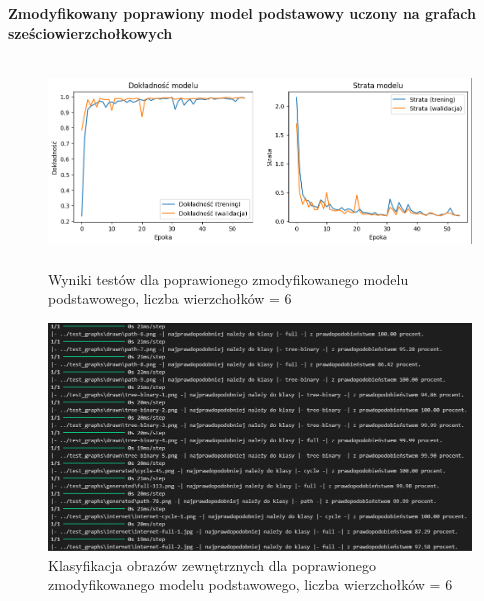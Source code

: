 
\textbf{Zmodyfikowany poprawiony model podstawowy uczony na grafach sześciowierzchołkowych}




\begin{figure}[ht]
	\centering
	\includegraphics[height=5.5cm]{resources/tests/images/v4/base6_1_1_img.png}
	\caption{Wyniki testów dla poprawionego zmodyfikowanego modelu podstawowego, liczba wierzchołków = 6}
	\label{Fig:tests-base-6a}
\end{figure}
\FloatBarrier


\begin{figure}[ht]
	\centering
	\includegraphics[width=14cm]{resources/tests/images/v4/base6_1_1_txt.png}
	\caption{Klasyfikacja obrazów zewnętrznych dla poprawionego zmodyfikowanego modelu podstawowego, liczba wierzchołków = 6}
	\label{Fig:tests-base-6b}
\end{figure}
\FloatBarrier

